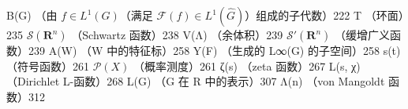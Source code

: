 B(G) （由 \(f \in L^{1}(G)\)（满足 \(\mathcal{F}(f) \in L^{1}(\widehat{G})\)）组成的子代数）222 T （环面）235 \(\mathcal{S}(\mathbf{R}^{n})\) （Schwartz 函数）238 V(Λ) （余体积）239 \(\mathcal{S}'(\mathbf{R}^{n})\) （缓增广义函数）239 A(W) （W 中的特征标）258 Y(F) （生成的 L∞(G) 的子空间）258 s(t) （符号函数）261 \(\mathcal{P}(X)\) （概率测度）261 ζ(s) （zeta 函数）267 L(s, χ) （Dirichlet L-函数）268 L(G) （G 在 R 中的表示）307 Λ(n) （von Mangoldt 函数）312

